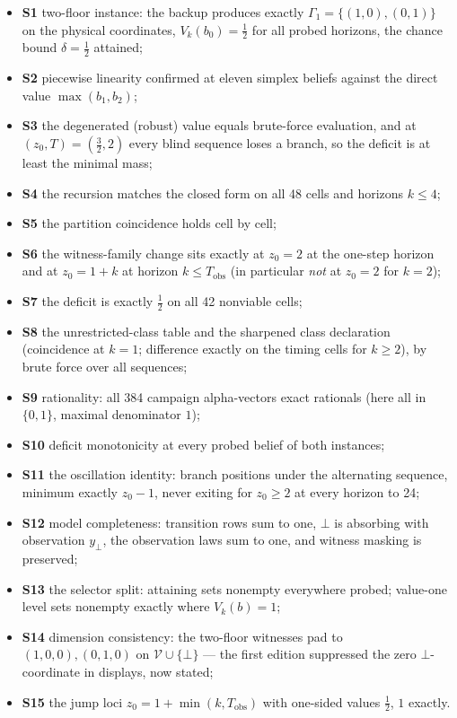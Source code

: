 \documentclass[10pt,twocolumn]{article}
\theoremstyle{definition}
\providecommand{\tightlist}{\setlength{\itemsep}{0pt}\setlength{\parskip}{0pt}}
\begin{document}
\begin{itemize}\tightlist
\item \textbf{S1} two-floor instance: the backup produces exactly
\(\Gamma_{1} = \{(1,0), (0,1)\}\) on the physical coordinates,
\(V_{k}(b_{0}) = \tfrac12\) for all probed horizons, the chance bound
\(\delta = \tfrac12\) attained;
\item \textbf{S2} piecewise linearity confirmed at eleven simplex beliefs
against the direct value \(\max(b_{1}, b_{2})\);
\item \textbf{S3} the degenerated (robust) value equals brute-force
evaluation, and at \((z_{0}, T) = (\tfrac32, 2)\) every blind sequence
loses a branch, so the deficit is at least the minimal mass;
\item \textbf{S4} the recursion matches the closed form on all 48 cells
and horizons \(k \le 4\);
\item \textbf{S5} the partition coincidence holds cell by cell;
\item \textbf{S6} the witness-family change sits exactly at \(z_{0} = 2\)
at the one-step horizon and at \(z_{0} = 1 + k\) at horizon \(k \le
T_{\mathrm{obs}}\) (in particular \emph{not} at \(z_{0} = 2\) for
\(k = 2\));
\item \textbf{S7} the deficit is exactly \(\tfrac12\) on all 42 nonviable
cells;
\item \textbf{S8} the unrestricted-class table and the sharpened class
declaration (coincidence at \(k = 1\); difference exactly on the timing
cells for \(k \ge 2\)), by brute force over all sequences;
\item \textbf{S9} rationality: all 384 campaign alpha-vectors exact
rationals (here all in \(\{0,1\}\), maximal denominator \(1\));
\item \textbf{S10} deficit monotonicity at every probed belief of both
instances;
\item \textbf{S11} the oscillation identity: branch positions under the
alternating sequence, minimum exactly \(z_{0} - 1\), never exiting for
\(z_{0} \ge 2\) at every horizon to 24;
\item \textbf{S12} model completeness: transition rows sum to one,
\(\bot\) is absorbing with observation \(y_{\bot}\), the observation laws
sum to one, and witness masking is preserved;
\item \textbf{S13} the selector split: attaining sets nonempty everywhere
probed; value-one level sets nonempty exactly where \(V_{k}(b) = 1\);
\item \textbf{S14} dimension consistency: the two-floor witnesses pad to
\((1,0,0), (0,1,0)\) on \(\mathcal{V} \cup \{\bot\}\) — the first edition
suppressed the zero \(\bot\)-coordinate in displays, now stated;
\item \textbf{S15} the jump loci \(z_{0} = 1 + \min(k, T_{\mathrm{obs}})\)
with one-sided values \(\tfrac12\), \(1\) exactly.
\end{itemize}
\end{document}

